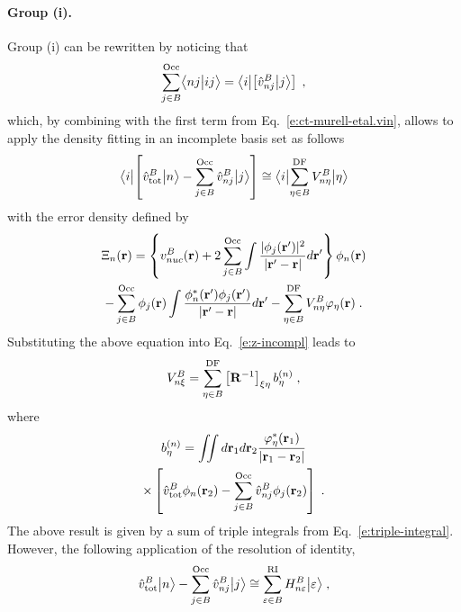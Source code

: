 \paragraph{Group (i).}
Group (i) can be rewritten by noticing that
%
\begin{equation} \label{e:ct-murell-etal.group-i.notice}
 \sum_{j\in B}^{\rm Occ} 
 \BraKet{nj}{ij} =
 \Bra{i} \left[ \hat{v}^B_{nj} \Ket{j} \right]  \;,
\end{equation}
%
which, by combining with the first term from Eq.~\eqref{e:ct-murell-etal.vin}, 
allows to apply the density fitting in an
incomplete basis set as follows
%
\begin{equation} \label{e:v-oep.ct}
\Bra{i} \left[ \hat{v}^B_{\rm tot} \Ket{n} - \sum_{j\in B}^{\rm Occ} \hat{v}^B_{nj} \Ket{j} \right]
\cong \Bra{i} \sum_{\eta\in B}^{\rm DF} V^B_{n\eta} \Ket{\eta}
\end{equation}
%
with the error density defined by
%
\begin{multline}
 \Xi_n({\bf r}) = 
  \left\{
      v_{nuc}^B({\bf r}) + 2 \sum_{j\in B}^{\rm Occ}
   \int \frac{ \vert \phi_j({\bf r}') \vert^2 }{\vert {\bf r}' - {\bf r} \vert} d{\bf r}'
  \right\}
  \phi_n({{\bf r}})  \\
 - \sum_{j\in B}^{\rm Occ} \phi_j({{\bf r}})
   \int \frac{ \phi^*_n({\bf r}') \phi_j({{\bf r}'}) }{\vert {\bf r}' - {\bf r} \vert} d{\bf r}'
 - \sum_{\eta\in B}^{\rm DF} V^B_{n\eta} \varphi_\eta({\bf r}) \;.
\end{multline}
%
Substituting the above equation into Eq.~\eqref{e:z-incompl}
leads to
%
\begin{equation}
 V^B_{n\xi} = \sum_{\eta\in B}^{\rm DF} \left[ {\bf R}^{-1} \right]_{\xi\eta} b_\eta^{(n)} \;,
\end{equation}
%
where
%
\begin{multline}
 b^{(n)}_\eta = \iint 
           d{\bf r}_1 d{\bf r}_2  
           \frac{ \varphi^*_\eta({\bf r}_1) }
            {\vert {\bf r}_1 - {\bf r}_2 \vert } \\ \times
          \left[ 
           \hat{v}^B_{\rm tot}  \phi_n({\bf r}_2) 
         - \sum_{j\in B}^{\rm Occ} \hat{v}^B_{nj} \phi_j({{\bf r}_2})
           \right]  \;.
\end{multline}
%
The above result is given by a sum of triple integrals from Eq.~\eqref{e:triple-integral}.
However, the following application of the resolution of identity,
%
\begin{equation}
 \hat{v}^B_{\rm tot} \Ket{n} - \sum_{j\in B}^{\rm Occ} \hat{v}^B_{nj} \Ket{j}
 \cong \sum_{\varepsilon\in B}^{\rm RI} H_{n\varepsilon}^B \Ket{\varepsilon} \;,
\end{equation}

